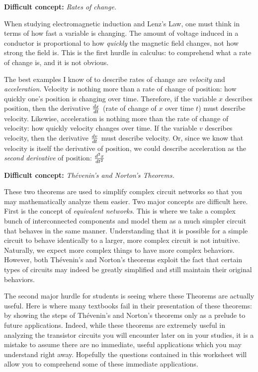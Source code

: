 \vskip 10pt

\noindent
{\bf Difficult concept: } {\it Rates of change.}

When studying electromagnetic induction and Lenz's Law, one must think in terms of how fast a variable is changing.  The amount of voltage induced in a conductor is proportional to how {\it quickly} the magnetic field changes, not how strong the field is.  This is the first hurdle in calculus: to comprehend what a rate of change is, and it is not obvious.

The best examples I know of to describe rates of change are {\it velocity} and {\it acceleration}.  Velocity is nothing more than a rate of change of position: how quickly one's position is changing over time.  Therefore, if the variable $x$ describes position, then the derivative ${dx \over dt}$ (rate of change of $x$ over time $t$) must describe velocity.  Likewise, acceleration is nothing more than the rate of change of velocity: how quickly velocity changes over time.  If the variable $v$ describes velocity, then the derivative ${dv \over dt}$ must describe velocity.  Or, since we know that velocity is itself the derivative of position, we could describe acceleration as the {\it second derivative} of position: ${d^2 x \over dt^2}$

\vskip 10pt

\vfil \eject

\noindent
{\bf Difficult concept: } {\it Th\'evenin's and Norton's Theorems.}

These two theorems are used to simplify complex circuit networks so that you may mathematically analyze them easier.  Two major concepts are difficult here.  First is the concept of {\it equivalent networks}.  This is where we take a complex bunch of interconnected components and model them as a much simpler circuit that behaves in the same manner.  Understanding that it is possible for a simple circuit to behave identically to a larger, more complex circuit is not intuitive.  Naturally, we expect more complex things to have more complex behaviors.  However, both Th\'evenin's and Norton's theorems exploit the fact that certain types of circuits may indeed be greatly simplified and still maintain their original behaviors.

The second major hurdle for students is seeing where these Theorems are actually useful.  Here is where many textbooks fail in their presentation of these theorems: by showing the steps of Th\'evenin's and Norton's theorems only as a prelude to future applications.  Indeed, while these theorems are extremely useful in analyzing the transistor circuits you will encounter later on in your studies, it is a mistake to assume there are no immediate, useful applications which you may understand right away.  Hopefully the questions contained in this worksheet will allow you to comprehend some of these immediate applications.

